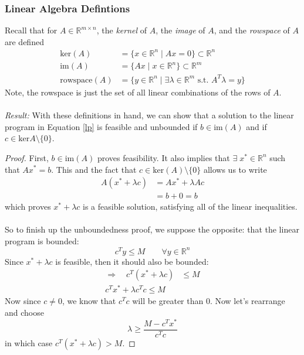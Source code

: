 \documentclass[a4paper,12pt]{scrartcl}
\theoremstyle{definition}
\theoremstyle{remark}
\begin{document}
\subsubsection{Linear Algebra Defintions}

Recall that for $A \in \mathbb{R}^{m\times n}$, the \emph{kernel}
of $A$, the \emph{image} of $A$, and the \emph{rowspace}
of $A$ are defined
\begin{align*}
   \text{ker}(A) &= \{ x \in \mathbb{R}^n \; | \; Ax =0 \} \subset
      \mathbb{R}^n\\
   \text{im}(A) &= \{ A x \; | \; x\in \mathbb{R}^n \} \subset
      \mathbb{R}^m\\
   \text{rowspace}(A) &= \{ y \in \mathbb{R}^n \; | \; \exists \lambda
   \in \mathbb{R}^m \text{ s.t. } A^T \lambda = y \}
\end{align*}
Note, the rowspace is just the set of all linear combinations of the
rows of $A$.
\\
\\
{\sl Result:}
With these definitions in hand, we can show that a solution to the
linear program in Equation \ref{lp} is feasible and unbounded if
$b \in \text{im}(A)$ and if $c \in \text{ker} A \setminus \{ 0 \}$.
\begin{proof}
   First, $b \in \text{im}(A)$ proves feasibility. It also implies that
   $\exists\; x^* \in \mathbb{R}^n$ such that $A x^* = b$. This
   and the fact that $c \in \text{ker}(A)\setminus \{0\}$
   allows us to write
   \begin{align*}
      A(x^* + \lambda c) &= Ax^* + \lambda A c \\
      &= b + 0 = b
   \end{align*}
   which proves $x^* + \lambda c$ is a feasible solution, satisfying
   all of the linear inequalities.
   \\\\
   So to finish up the unboundedness proof, we suppose the opposite:
   that the linear program is bounded:
      \[ c^T y \leq M \qquad \forall y \in \mathbb{R}^n \]
   Since $x^* + \lambda c$ is feasible, then it should also be bounded:
   \begin{align*}
      \Rightarrow \quad c^T (x^* + \lambda c ) &\leq M\\
      c^T x^* + \lambda c^T c \leq M
   \end{align*}
   Now since $c \neq 0$, we know that $c^T c$ will be greater than
   0. Now let's rearrange and choose
      \[ \lambda \geq \frac{M - c^T x^*}{c^T c} \]
   in which case $c^T ( x^* + \lambda c) > M$.
\end{proof}
\end{document}
